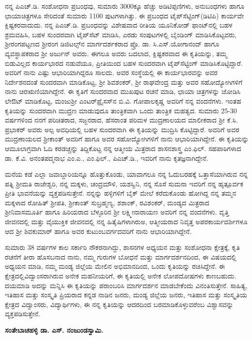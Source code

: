 ನನ್ನ ಪಿಎಚ್​.ಡಿ. ಸಂಶೋಧನಾ ಪ್ರಬಂಧವು, ಸುಮಾರು 3000ಕ್ಕೂ ಹೆಚ್ಚು ಅಡಿಟಿಪ್ಪಣಿಗಳು, ಅನುಬಂಧಗಳು ಹಾಗೂ ಛಾಯಾಚಿತ್ರಗಳೂ ಸೇರಿದಂತೆ ಸುಮಾರು 1100 ಪುಟಗಳಾಗಿತ್ತು. ಈ ಪ್ರಬಂಧದ ಟೈಪ್​ಸೆಟ್ಟಿಂಗ್​(ಡಿಟಿಪಿ) ಕಾರ್ಯವೇ ಕ್ಲಿಷ್ಟಕರವಾದುದು. ನನ್ನ ಪಿಎಚ್​.ಡಿ. ಪ್ರಬಂಧವನ್ನು ವಿಶೇಷವಾದ ರೀತಿಯ ಯೂನಿಕೋಡ್​ ಫಾಂಟ್​ನಲ್ಲಿ ಬಹಳ ಶ್ರಮ\-ವಹಿಸಿ, ಬಹಳ ಸುಂದರವಾಗಿ ಟೈಪ್​ಸೆಟ್​ ಮಾಡಿಸಿ, ಎರಡು ಸಂಪುಟಗಳಲ್ಲಿ ಬೈಂಡಿಂಗ್​ ಮಾಡಿಸಿಕೊಟ್ಟವರು, ಶ‍್ರೀರಂಗಪಟ್ಟಣದ ಶ‍್ರೀರಂಗ ಡಿಜಿಟಲ್ಸ್​ನ ಮಾರ್ಗದರ್ಶಕರಾದ ಪ್ರೊ. ಡಾ. ಸಿ.ಎಸ್​.ಯೋಗಾನಂದ್​ ಹಾಗೂ ವ್ಯವಸ್ಥಾಪಕರಾದ ಶ‍್ರೀ ಅರ್ಜುನ್​ ಅವರು. ಈಗಲೂ ಅವರು ಬದಲಾದ, ಕ್ಲಿಷ್ಟಕರವಾದ ಈ ಕೃತಿಯನ್ನು, ತಮ್ಮ ಬಿಡುವಿಲ್ಲದ ಕಾರ್ಯಭಾರದ ನಡುವೆಯೂ, ಪ್ರೀತಿಯಿಂದ ಬಹಳ ಸುಂದರವಾಗಿ ಟೈಪ್​ಸೆಟ್ಟಿಂಗ್​ ಮಾಡಿಸಿಕೊಟ್ಟಿದ್ದಾರೆ. ಅವರಿಗೆ ನಾನು ಎಷ್ಟು ಆಭಾರಿ\-ಯಾಗಿದ್ದರೂ ಸಾಲದು. ಅವರ ಸಂಸ್ಥೆಯಲ್ಲಿ ಈ ಕಾರ್ಯಭಾರವನ್ನು ಅವರ ನಿರ್ದೇಶನದಂತೆ ಸುಂದರವಾಗಿ ಮಾಡಿಕೊಟ್ಟ, ಶ‍್ರೀ ಶಿವಶಂಕರ್​, ಶ‍್ರೀ ರಾಘವೇಂದ್ರ ಮತ್ತು ಅವರ ಸಹೋದ್ಯೋಗಿಗಳಿಗೆ ನಾನು ಚಿರಋಣಿಯಾಗಿದ್ದೇನೆ. ಈ ಕೃತಿಗೆ ಸುಂದರವಾದ ಮುಖಪುಟ ರಚನೆ ಮಾಡಿ, ಛಾಯಾ ಚಿತ್ರಗಳನ್ನು ಜೋಡಿಸಿ ಲೇಔಟ್​ ಮಾಡಿಕೊಟ್ಟ, ಮಂಜುಶ‍್ರೀ ಎಂಟರ್​\-ಪ್ರೈಸಸ್​ನ ಬಿ.ವಿ. ಗೋಪಾಲಕೃಷ್ಣ ಅವರಿಗೆ ನನ್ನ ವಂದನೆಗಳು. ಇಂತಹ ಕೃತಿಯನ್ನು ಸುಂದರವಾಗಿ ಮುದ್ರಣ ಮಾಡುವುದೂ ತಾಂತ್ರಿಕವಾಗಿ ಒಂದು ತಾಂತ್ರಿಕ ಮಹತ್ವದ. ಸುಮಾರು 25-30 ವರ್ಷಗಳಿಂದ ನನಗೆ ಪರಿಚಿತರಾದ, ಸಜ್ಜನರಾದ, ಹೆಸರಾಂತ ಪರಿಮಳ ಮುದ್ರಣಾಲಯದ ಮಾಲೀಕರಾದ ಶ‍್ರೀ ಕೆ.ಸಿ. ಪ್ರಭಾಕರ್​ ಅವರು ಅಲ್ಪ ಅವಧಿಯಲ್ಲಿ ಬಹಳ ಸುಂದರವಾಗಿ ಈ ಕೃತಿಯನ್ನು ಮುದ್ರಿಸಿ ಕೊಟ್ಟಿದ್ದಾರೆ. ಅವರಿಗೆ ಅವರ ಮುದ್ರಣಾಯಲದ ಶ‍್ರೀಕಾಂತ್​ ಅವರಿಗೆ ಹಾಗೂ ಅವರ ಸಹೋದ್ಯೋಗಿ\-ಗಳಿಗೆ ನಾನು ಆಭಾರಿಯಾಗಿದ್ದೇನೆ. ಈ ಕೃತಿಯನ್ನು ಆಮೂಲಾಗ್ರವಾಗಿ ಓದಿ ಕರಡಚ್ಚನ್ನು ತಿದ್ದಿಕೊಟ್ಟ ನನ್ನ ಆತ್ಮೀಯ ಮಿತ್ರರಾದ ಶಾಸನಶಾಸ್ತ್ರ ಎಂ.ಫಿಲ್. ಸಹಪಾಠಿಗಳಾದ ಡಾ. ಕೆ.ವಿ. ಅನಂತಪದ್ಮನಾಭ ಎಂ.ಎ., ಎಂ.ಫಿಲ್., ಪಿಎಚ್.ಡಿ., ಇವರಿಗೆ ನಾನು ಕೃತಜ್ಞನಾಗಿದ್ದೇನೆ.

ಮನೆಯ ಕಡೆ ಎಲ್ಲಾ ಜವಾಬ್ದಾರಿಯನ್ನೂ ಹೊತ್ತುಕೊಂಡು, ಯಾವಾಗಲೂ ನನ್ನ ಓದುಬರಹಕ್ಕೆ ಒತ್ತಾಸೆಯಾಗಿರುವ ನನ್ನ ಪತ್ನಿ ಶ‍್ರೀಮತಿ ರಾಜೇಶ್ವರಿ, ನನ್ನ ಮಕ್ಕಳು, ಚಂದ್ರಮೌಳಿ, ಯಶಸ್ವಿನಿ, ನನ್ನ ಸೊಸೆ ಸುಮನಾ ಇವರಿಗೆ ನನ್ನ ಹೃತ್ಪೂರ್ವಕ ಪ್ರೀತಿ ಭಾವನೆಯನ್ನು ವ್ಯಕ್ತಪಡಿಸುತ್ತೇನೆ. ನನ್ನನ್ನು ಹಳ್ಳಿಗಳಿಗೆ ಬೈಕ್​ ಮೇಲೆ ಕರೆದುಕೊಂಡು ಹೋಗಿದ್ದ ನನ್ನ ತಮ್ಮನ ಮಕ್ಕಳಾದ ರೋಹಿತ್​ ಶ‍್ರೀಪತಿ, ಶ‍್ರೀಕಾಂತ್​ ಸುಬ್ರಹ್ಮಣ್ಯ, ಶಶಾಂಕ್, ರವಿಶಂಕರ್, ಮಂಡ್ಯದ ಮಿತ್ರರಾದ ಶ‍್ರೀನಿವಾಸಮೂರ್ತಿ ಹಾಗೂ ಹಿರಿಯರಾದ ಬೆಳ್ಳೂರಿನ ಶ‍್ರೀ ಲಕ್ಷ್ಮೀನಾರಾಯಣ ಅವರಿಗೆ ನನ್ನ ವಂದನೆಗಳು. ವೃತ್ತಿ ಜೀವನದಲ್ಲಿ ಮತ್ತು ವೈಯುಕ್ತಿಕ ಜೀವನದಲ್ಲಿ ನನ್ನ ಹಿತೈಷಿಗಳಾಗಿರುಅ, ಆತ್ಮೀಯರಾದ ನಿವೃತ್ತ ಅಪರಕಾರ್ಯದರ್ಶಿಗಳೂ ಆದ ಶ‍್ರೀ ಶಿವಕುಮಾರ್ ಹಾಗೂ ಅವರ ಕುಟುಂಬವರ್ಗದವರಿಗೆ ನಾನು ಆಭಾರಿಯಾಗಿದ್ದೇನೆ.

ಸುಮಾರು 38 ವರ್ಷಗಳ ಕಾಲ ಸರ್ಕಾರಿ ನೌಕರನಾಗಿದ್ದು, ಶಾಸನಗಳ ಅಧ್ಯಯನ ಮತ್ತು ಸಂಶೋಧನಾ ಕ್ಷೇತ್ರಕ್ಕೆ, ಕೃತಿ ರಚನೆಗೆ ತೀರಾ ಹೊಸಬನಾದ ನಾನು, ನಮ್ಮ ಗುರುಗಳ ಬೋಧನೆ ಮತ್ತು ಮಾರ್ಗದರ್ಶನದಿಂದ, ಈ ವಿಷಯದಲ್ಲಿ ಅಧ್ಯಯನ ಮಾಡಿ, ನಮ್ಮ ಮಂಡ್ಯ ಜಿಲ್ಲೆಯ ಮೇಲಿನ ಅಭಿಮಾನದಿಂದ, ಒಂದು ಕೃತಿಯನ್ನು ರಚಿಸಿದ್ದೇನೆ. ಈ ಕ್ಷೇತ್ರದಲ್ಲಿ\break ವಿದ್ವಾಂಸರಾಗಿರುವ ಅನೇಕ ಮಹನೀಯರಿಗೆ, ಈ ಕೃತಿಯಲ್ಲಿ ಅನೇಕ ಲೋಪದೋಷಗಳು ಕಾಣಬಹುದು. ದಯಮಾಡಿ ಅದನ್ನು ಮನ್ನಿಸಿ ಈ ಕೃತಿಯನ್ನು ಪರಾಂಬರಿಸಿ ಮಾರ್ಗದರ್ಶನ ಮಾಡಬೇಕೆಂದು ವಿನಂತಿಸುತ್ತೇನೆ. ಸಾಹಿತ್ಯ, ಇತಿಹಾಸ ಮತ್ತು ಸಂಸ್ಕೃತಿ ಪ್ರಿಯರಾದ ಕನ್ನಡ ನಾಡಿನ ಜನರು, ಮಂಡ್ಯ ಜಿಲ್ಲೆಯ ಜನರು, ಇತಿಹಾಸ ಮತ್ತು ಸಂಸ್ಕೃತಿಯ ಕ್ಷೇತ್ರದ ವಿದ್ವಾಂಸರು, ವಿದ್ಯಾರ್ಥಿಗಳು, ಈ ನನ್ನ ಕೃತಿಯನ್ನು ಆದರದಿಂದ ಬರಮಾಡಿಕೊಳ್ಳುವರೆಂಬ ವಿಶ್ವಾಸವನ್ನು ವ್ಯಕ್ತಪಡಿಸುತ್ತೇನೆ.

\begin{flushright}
\textbf{ಸಂತೇಬಾಚಹಳ್ಳಿ ಡಾ. ಎಸ್​. ನಂಜುಂಡಸ್ವಾಮಿ.}
\end{flushright}

